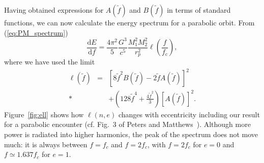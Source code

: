 \documentclass[aps,prd,amsfonts,amssymb,amsmath,nofootinbib,floatfix,reprint,showpacs,groupedaddress]{revtex4-1}
\newcommand{\eqnref}[1]{(\ref{eq:#1})}
\newcommand{\Figref}[1]{Figure~\ref{fig:#1}}
\newcommand{\sub}[1]{\ensuremath{_\text{#1}}}
\newcommand{\dd}{\ensuremath{\mathrm{d}}}
\newcommand{\diff}[2]{\ensuremath{\frac{\dd {#1}}{\dd {#2}}}}
\begin{document}
Having obtained expressions for $A(\tilde{f})$ and $B(\tilde{f})$ in terms of standard functions, we can now calculate the energy spectrum for a parabolic orbit. From \eqnref{PM_spectrum}
\begin{equation}
\diff{E}{f} = \frac{4\pi^2}{5}\frac{G^3}{c^5}\frac{M_1^2M_2^2}{r_{p}^2}\ell\left(\frac{f}{f\sub{c}}\right),
\label{eq:PM_dEdf}
\end{equation}
where we have used the limit
\begin{eqnarray}
\ell(\tilde{f}) & = & \left[8\tilde{f}^2B(\tilde{f}) - 2\tilde{f}A(\tilde{f})\right]^2 \nonumber \\*
 & & + \left(128\tilde{f}^4 + \frac{4\tilde{f}^2}{3}\right)\left[A(\tilde{f})\right]^2.
\end{eqnarray}
\Figref{ell} shows how $\ell(n,e)$ changes with eccentricity including our result for a parabolic encounter (cf. Fig.~3 of Peters and Matthews~\cite{Peters1963}). Although more power is radiated into higher harmonics, the peak of the spectrum does not move much: it is always between $f = f_{c}$ and $f = 2 f_{c}$, with $f = 2 f_{c}$ for $e = 0$ and $f \simeq 1.637 f_{c}$ for $e = 1$.
\end{document}
